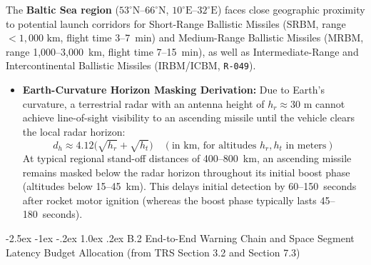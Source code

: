 \documentclass[11pt,a4paper]{article}
\makeatletter
\renewcommand\subsection{\@startsection{subsection}{2}{\z@}%
    {-2.5ex \@plus -1ex \@minus -.2ex}%
    {1.0ex \@plus .2ex}%
    {\normalfont\large\bfseries\sffamily\color{SubHeadingBlue}}}
\providecommand{\abbr}[1]{#1}
\makeatother
\begin{document}
The \textbf{Baltic Sea region} ($53^\circ\text{N}\text{--}66^\circ\text{N}$, $10^\circ\text{E}\text{--}32^\circ\text{E}$) faces close geographic proximity to potential launch corridors for Short-Range Ballistic Missiles (\abbr{SRBM}, range $< 1{,}000\text{ km}$, flight time 3--7~min) and Medium-Range Ballistic Missiles (\abbr{MRBM}, range 1,000--3,000~km, flight time 7--15~min), as well as Intermediate-Range and Intercontinental Ballistic Missiles (\abbr{IRBM}/\abbr{ICBM}, \texttt{R-049}).
\begin{itemize}
    \item \textbf{Earth-Curvature Horizon Masking Derivation:} Due to Earth's curvature, a terrestrial radar with an antenna height of $h_r \approx 30\text{ m}$ cannot achieve line-of-sight visibility to an ascending missile until the vehicle clears the local radar horizon:
    \[
        d_h \approx 4.12\bigl(\sqrt{h_r} + \sqrt{h_t}\bigr) \quad (\text{in km, for altitudes } h_r, h_t \text{ in meters})
    \]
    At typical regional stand-off distances of 400--800~km, an ascending missile remains masked below the radar horizon throughout its initial boost phase (altitudes below 15--45~km). This delays initial detection by 60--150~seconds after rocket motor ignition (whereas the boost phase typically lasts 45--180~seconds).
\end{itemize}

\subsection{B.2 End-to-End Warning Chain and Space Segment Latency Budget Allocation (from TRS Section 3.2 and Section 7.3)}
\end{document}
